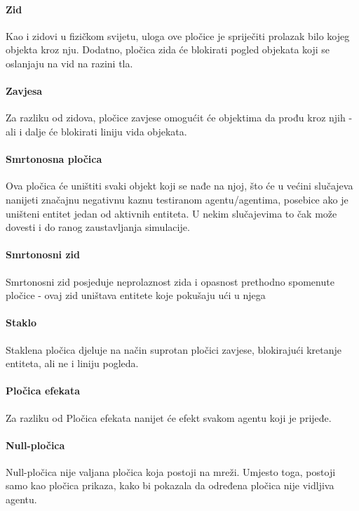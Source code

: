 \documentclass[diplomskirad]{fer}
\begin{document}
\paragraph{Zid}
Kao i zidovi u fizičkom svijetu, uloga ove pločice je spriječiti prolazak bilo kojeg objekta kroz nju. Dodatno, pločica zida će blokirati pogled objekata koji se oslanjaju na vid na razini tla.

\paragraph{Zavjesa}
Za razliku od zidova, pločice zavjese omogućit će objektima da prođu kroz njih - ali i dalje će blokirati liniju vida objekata.

\paragraph{Smrtonosna pločica}
Ova pločica će uništiti svaki objekt koji se nađe na njoj, što će u većini slučajeva nanijeti značajnu negativnu kaznu testiranom agentu/agentima, posebice ako je uništeni entitet jedan od aktivnih entiteta. U nekim slučajevima to čak može dovesti i do ranog zaustavljanja simulacije.

\paragraph{Smrtonosni zid}
Smrtonosni zid posjeduje neprolaznost zida i opasnost prethodno spomenute pločice - ovaj zid uništava entitete koje pokušaju ući u njega

\paragraph{Staklo}
Staklena pločica djeluje na način suprotan pločici zavjese, blokirajući kretanje entiteta, ali ne i liniju pogleda.

\paragraph{Pločica efekata}
Za razliku od 
Pločica efekata nanijet će efekt svakom agentu koji je prijeđe.

\paragraph{Null-pločica}
Null-pločica nije valjana pločica koja postoji na mreži. Umjesto toga, postoji samo kao pločica prikaza, kako bi pokazala da određena pločica nije vidljiva agentu.
\end{document}
